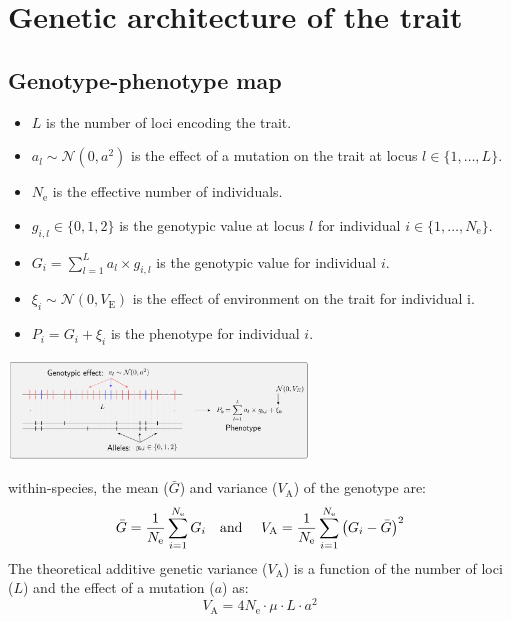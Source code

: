 \documentclass{article}
\newcommand{\Multiply}{\cdot}
\newcommand{\Ne}{N_{\text{e}}}
\newcommand{\Trait}{P}
\newcommand{\MutationRatePheno}{\mu}
\newcommand{\NbrLoci}{L}
\newcommand{\VarGenetic}{V_{\mathrm{A}}}
\newcommand{\VarEnv}{V_{\mathrm{E}}}
\renewcommand{\baselinestretch}{1.5}
\begin{document}
\renewcommand{\baselinestretch}{1.0}\normalsize
\tableofcontents
\renewcommand{\baselinestretch}{1.5}\normalsize

\newpage
\section{Genetic architecture of the trait}\label{sec:simulator}

\subsection{Genotype-phenotype map}\label{subsec:genotype-phenotype-map}

\begin{itemize}
    \item $\NbrLoci$ is the number of loci encoding the trait.
    \item $a_l \sim \mathcal{N}(0,a^2)$ is the effect of a mutation on the trait at locus $l \in \{1, \hdots, \NbrLoci\}$.
    \item $\Ne$ is the effective number of individuals.
    \item $g_{i,l} \in \{0, 1, 2\}$ is the genotypic value at locus $l$ for individual $i \in \{1, \hdots, \Ne\}$.
    \item $G_i = \sum_{l=1}^{\NbrLoci} a_l \times g_{i,l}$ is the genotypic value for individual $i$.
    \item $\xi_i \sim \mathcal{N}(0, \VarEnv)$ is the effect of environment on the trait for individual i.
    \item $\Trait_i = G_i + \xi_i$ is the phenotype for individual $i$.
\end{itemize}

\begin{center}
    \includegraphics[width=0.6\textwidth, page=1] {figureS1}
    \label{fig:simulator-summary}
\end{center}

within-species, the mean ($\bar{G}$) and variance ($\VarGenetic$) of the genotype are:
\begin{equation}
    \bar{G} = \frac{1}{\Ne}\sum_{i=1}^{\Ne} G_i  \text{\quad and \quad} \VarGenetic = \frac{1}{\Ne}\sum_{i=1}^{\Ne}\left(G_i - \bar{G} \right)^2\label{eq:simu-genotype}
\end{equation}
The theoretical additive genetic variance ($\VarGenetic$) is a function of the number of loci ($\NbrLoci$) and the effect of a mutation ($a$) as:
\begin{equation}
    \VarGenetic = 4 \Ne \Multiply \MutationRatePheno \Multiply \NbrLoci \Multiply a^2 \label{eq:simu-var-genetic}
\end{equation}
\end{document}
